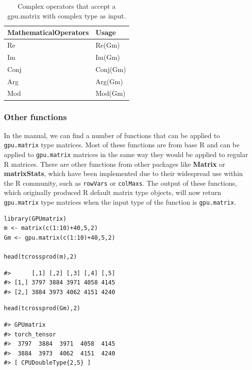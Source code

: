 \begin{table}

\caption{\label{tab:complex-operators}Complex operators that accept a gpu.matrix with complex type as input.}
\centering
\begin{tabular}[t]{ll}
\toprule
MathematicalOperators & Usage\\
\midrule
Re & Re(Gm)\\
Im & Im(Gm)\\
Conj & Conj(Gm)\\
Arg & Arg(Gm)\\
Mod & Mod(Gm)\\
\bottomrule
\end{tabular}
\end{table}

\hypertarget{other-functions}{%
\subsubsection{Other functions}\label{other-functions}}

In the manual, we can find a number of functions that can be applied to \texttt{gpu.matrix} type matrices. Most of these functions are from base R and can be applied to \texttt{gpu.matrix} matrices in the same way they would be applied to regular R matrices. There are other functions from other packages like \textbf{Matrix} or \textbf{matrixStats}, which have been implemented due to their widespread use within the R community, such as \texttt{rowVars} or \texttt{colMaxs}. The output of these functions, which originally produced R default matrix type objects, will now return \texttt{gpu.matrix} type matrices when the input type of the function is \texttt{gpu.matrix}.

\begin{verbatim}
library(GPUmatrix)
m <- matrix(c(1:10)+40,5,2)
Gm <- gpu.matrix(c(1:10)+40,5,2)

head(tcrossprod(m),2)
\end{verbatim}

\begin{verbatim}
#>      [,1] [,2] [,3] [,4] [,5]
#> [1,] 3797 3884 3971 4058 4145
#> [2,] 3884 3973 4062 4151 4240
\end{verbatim}

\begin{verbatim}
head(tcrossprod(Gm),2)
\end{verbatim}

\begin{verbatim}
#> GPUmatrix
#> torch_tensor
#>  3797  3884  3971  4058  4145
#>  3884  3973  4062  4151  4240
#> [ CPUDoubleType{2,5} ]
\end{verbatim}

